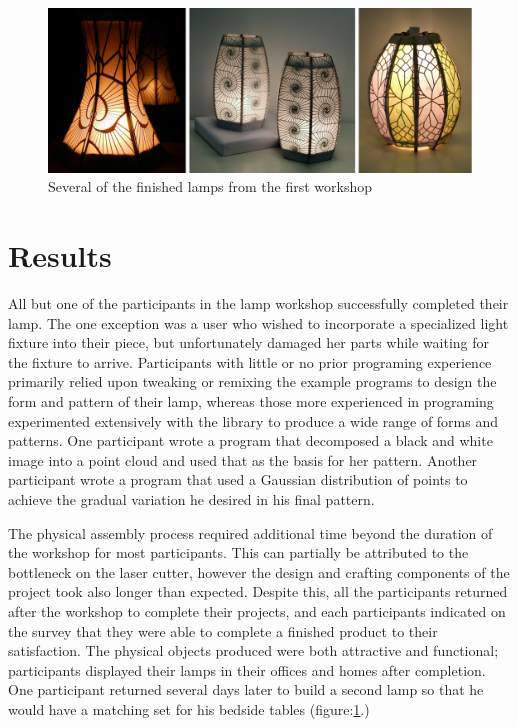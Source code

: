 \begin{center}
\begin{figure}[h!]
\includegraphics[width=6.5in]{images/finished_lamps2.png}
\caption{Several of the finished lamps from the first workshop}
\label{fig:finished_lamps}
\end{figure}
\end{center}

\section{ Results}
All but one of the participants in the lamp workshop successfully completed their lamp. The one exception was a user who wished to incorporate a specialized light fixture into their piece, but unfortunately damaged her parts while waiting for the fixture to arrive. Participants with little or no prior programing experience primarily relied upon tweaking or remixing the example programs to design the form and pattern of their lamp, whereas those more experienced in programing experimented extensively with the library to produce a wide range of forms and patterns. One participant wrote a program that decomposed a black and white image into a point cloud and used that as the basis for her pattern. Another participant wrote a program that used a Gaussian distribution of points to achieve the gradual variation he desired in his final pattern. 

 The physical assembly process required additional time beyond the duration of the workshop for most participants. This can partially be attributed to the bottleneck on the laser cutter, however the design and crafting components of the project took also longer than expected. Despite this, all the participants returned after the workshop to complete their projects, and each participants indicated on the survey that they were able to complete a finished product to their satisfaction. The physical objects produced were both attractive and functional; participants displayed their lamps in their offices and homes after completion. One participant returned several days later to build a second lamp so that he would have a matching set for his bedside tables (figure:\ref{fig:finished_lamps}.)		
		
